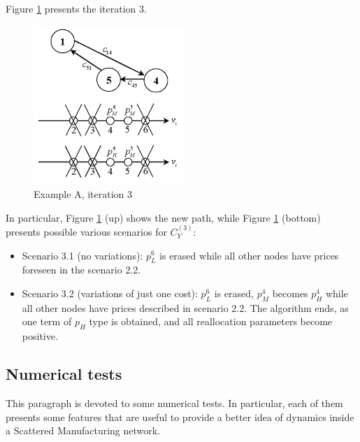 Figure \ref{fig:expA-it3} presents the iteration 3.
\begin{figure}[h]
    \centering
    \includegraphics[height=6cm, keepaspectratio]{images/expA-it3}
    \caption{Example A, iteration 3}
    \label{fig:expA-it3}
\end{figure}

In particular, Figure \ref{fig:expA-it3} (up) shows the new path, while Figure \ref{fig:expA-it3} (bottom) presents possible various scenarios for $C_Y^{(3)}$:
\begin{itemize}
    \item Scenario 3.1 (no variations): $p_L^6$ is erased while all other nodes have prices foreseen in the scenario 2.2.
    \item Scenario 3.2 (variations of just one cost): $p_L^6$ is erased, $p_M^4$ becomes $p_H^4$ while all other nodes have prices described in scenario 2.2. The algorithm ends, as one term of $p_H$ type is obtained, and all reallocation parameters become positive.
\end{itemize}

\subsection{Numerical tests}
This paragraph is devoted to some numerical tests. In particular, each of them presents some features that are useful to provide a better idea of dynamics inside a Scattered Manufacturing network.
